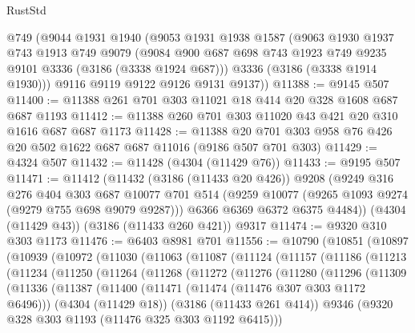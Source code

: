 \begin{lexlean}{RustStd}
\begin{coremodule}
{\begin{coremodule}
{{{{{{{{{{{{{{{{{{{{    @749
    (@9044
      @1931
      @1940
      (@9053
        @1931
        @1938
        @1587
        (@9063
          @1930
          @1937
          @743
          @1913
          @749
          @9079
          (@9084 @900 @687 @698 @743 @1923 @749 @9235 @9101 @3336 (@3186 (@3338 @1924 @687)))
          @3336
          (@3186 (@3338 @1914 @1930)))
        @9116
        @9119
        @9122
        @9126
        @9131
        @9137))
@11388 := @9145 @507
@11400 := @11388 @261 @701 @303 @11021 @18 @414 @20 @328 @1608 @687 @687 @1193
@11412 := @11388 @260 @701 @303 @11020 @43 @421 @20 @310 @1616 @687 @687 @1173
@11428 := @11388 @20 @701 @303 @958 @76 @426 @20 @502 @1622 @687 @687 @11016 (@9186 @507 @701 @303)
@11429 := @4324 @507
@11432 := @11428 (@4304 (@11429 @76))
@11433 := @9195 @507
@11471 := @11412
    (@11432
      (@3186 (@11433 @20 @426))
      @9208
      (@9249
        @316
        @276
        @404
        @303
        @687
        @10077
        @701
        @514
        (@9259 @10077 (@9265 @1093 @9274 (@9279 @755 @698 @9079 @9287)))
        @6366
        @6369
        @6372
        @6375
        @4484))
    (@4304 (@11429 @43))
    (@3186 (@11433 @260 @421))
    @9317
@11474 := @9320 @310 @303 @1173
@11476 := @6403 @8981 @701
@11556 := @10790
    (@10851
      (@10897
        (@10939
          (@10972
            (@11030
              (@11063
                (@11087
                  (@11124
                    (@11157
                      (@11186
                        (@11213
                          (@11234
                            (@11250
                              (@11264
                                (@11268
                                  (@11272
                                    (@11276
                                      (@11280
                                        (@11296
                                          (@11309
                                            (@11336
                                              (@11387
                                                (@11400
                                                  (@11471 (@11474 (@11476 @307 @303 @1172 @6496)))
                                                  (@4304 (@11429 @18))
                                                  (@3186 (@11433 @261 @414))
                                                  @9346
                                                  (@9320
                                                    @328
                                                    @303
                                                    @1193
                                                    (@11476 @325 @303 @1192 @6415)))
}}}}}}}}}}}}}}}}}}}}
\end{coremodule}}
\end{coremodule}
\end{lexlean}
